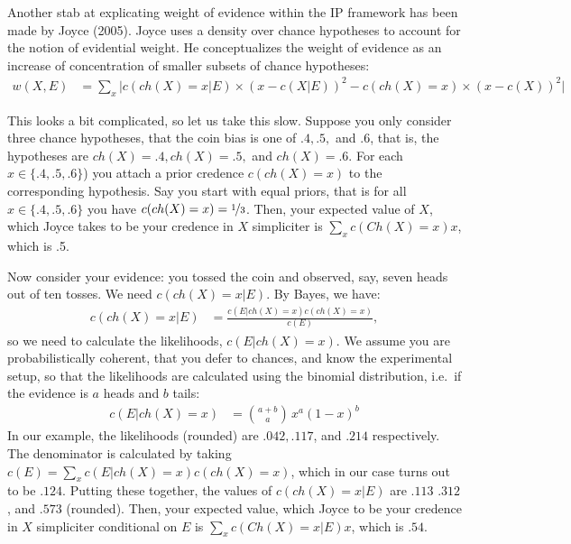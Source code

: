 \documentclass[
  10pt,
  dvipsnames,enabledeprecatedfontcommands]{scrartcl}
\begin{document}
Another stab at explicating weight of evidence within the \textsf{IP}
framework has been made by Joyce (2005). Joyce uses a density over
chance hypotheses to account for the notion of evidential weight. He
conceptualizes the weight of evidence as an increase of concentration of
smaller subsets of chance hypotheses: \begin{align}
\tag{Joyce} w(X,E) & = \sum_x \vert c(ch(X) = x  \vert E) \times (x - c(X\vert E))^2 - c(ch(X) = x) \times (x - c(X))^2\vert
\end{align}

\noindent This looks a bit complicated, so let us take this slow.
Suppose you only consider three chance hypotheses, that the coin bias is
one of \(.4, .5,\) and \(.6\), that is, the hypotheses are
\(ch(X) = .4, ch(X)=.5,\) and \(ch(X)=.6\). For each
\(x\in \{.4, .5, .6\}\)) you attach a prior credence \(c(ch(X) = x)\) to
the corresponding hypothesis. Say you start with equal priors, that is
for all \(x\in \{.4, .5, .6\}\) you have
\(c(ch(X) =x) = \nicefrac{1}{3}\). Then, your expected value of \(X\),
which Joyce takes to be your credence in \(X\) simpliciter is
\(\sum_x c(Ch(X)=x)x\), which is .5.

Now consider your evidence: you tossed the coin and observed, say, seven
heads out of ten tosses. We need \(c(ch(X)=x \vert E)\). By Bayes, we
have: \begin{align*}
c(ch(X)=x \vert E) & = \frac{c(E \vert ch(X) =x) c(ch(X)=x )}{c(E)},
\end{align*} \noindent so we need to calculate the likelihoods,
\(c(E \vert ch(X) =x)\). We assume you are probabilistically coherent,
that you defer to chances, and know the experimental setup, so that the
likelihoods are calculated using the binomial distribution, i.e.~if the
evidence is \(a\) heads and \(b\) tails: \begin{align*}
c(E \vert ch(X) =x) & = {a+b \choose a}\,x ^a (1-x)^{b}
\end{align*} \noindent In our example, the likelihoods (rounded) are
\(.042, .117\), and \(.214\) respectively. The denominator is calculated
by taking \(c(E) = \sum_x c(E \vert ch(X) =x) c(ch(X)=x)\), which in our
case turns out to be \(.124\). Putting these together, the values of
\(c(ch(X)=x \vert E)\) are \(.113\) \(.312\), and \(.573\) (rounded).
Then, your expected value, which Joyce to be your credence in \(X\)
simpliciter conditional on \(E\) is \(\sum_x c(Ch(X)=x\vert E)x\), which
is \(.54\).
\end{document}
